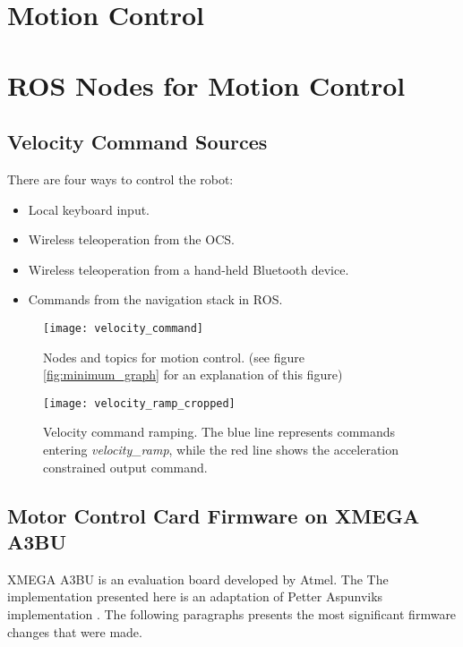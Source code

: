 \section{Motion Control}

\section{ROS Nodes for Motion Control}


\subsection{Velocity Command Sources}

There are four ways to control the robot:

\begin{itemize}
	\item Local keyboard input.
	\item Wireless teleoperation from the \ac{OCS}.
	\item Wireless teleoperation from a hand-held Bluetooth device.
	\item Commands from the navigation stack in \ac{ROS}.
\end{itemize}

\begin{figure}[h]
	\centering
	\texttt{[image: velocity\_command]}
	\caption{Nodes and topics for motion control. (see figure \ref{fig:minimum_graph} for an explanation of this figure)}
	\label{fig:move_base_nodes}
\end{figure}

\begin{figure}[h]
	\centering
	\texttt{[image: velocity\_ramp\_cropped]}
	\caption{Velocity command ramping. The blue line represents commands entering \textit{velocity\_ramp}, while the red line shows the acceleration constrained output command.}
	\label{fig:velocity_ramp}
\end{figure}

\subsection{Motor Control Card Firmware on XMEGA A3BU}

XMEGA A3BU is an evaluation board developed by Atmel. The The implementation presented here is an adaptation of Petter Aspunviks implementation \cite{aspunvik}. The following paragraphs presents the most significant firmware changes that were made.

